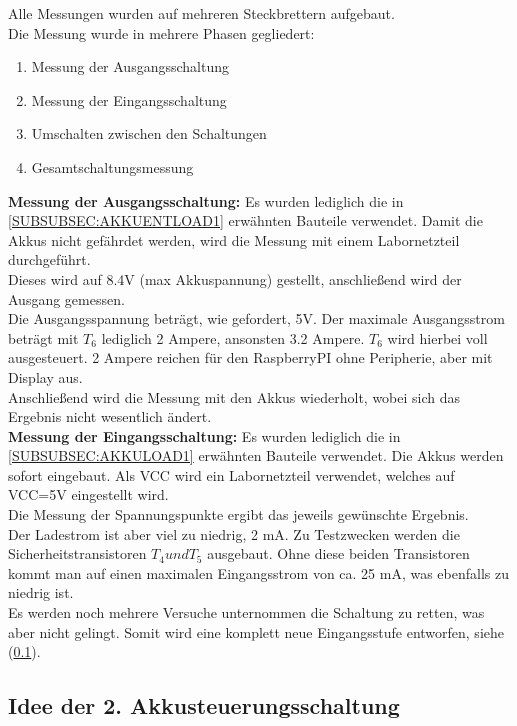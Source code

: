 \documentclass[12pt,a4paper]{article}
\begin{document}
{Alle Messungen wurden auf mehreren Steckbrettern aufgebaut. \\
Die Messung wurde in mehrere Phasen gegliedert:
\begin{enumerate}
	\item{Messung der Ausgangsschaltung}
	\item{Messung der Eingangsschaltung}
	\item{Umschalten zwischen den Schaltungen}
	\item{Gesamtschaltungsmessung}
\end{enumerate}
\textbf{Messung der Ausgangsschaltung:}  Es wurden lediglich die in \ref{SUBSUBSEC:AKKUENTLOAD1} erwähnten Bauteile verwendet. Damit die Akkus nicht gefährdet werden, wird die Messung mit einem Labornetzteil durchgeführt. \\
Dieses wird auf 8.4V (max Akkuspannung) gestellt, anschließend wird der Ausgang gemessen. \\
Die Ausgangsspannung beträgt, wie gefordert, 5V.
Der maximale Ausgangsstrom beträgt mit $T_6$ lediglich 2 Ampere, ansonsten 3.2 Ampere. $T_6$ wird hierbei voll ausgesteuert. 2 Ampere reichen für den RaspberryPI ohne Peripherie, aber mit Display aus. \\
Anschließend wird die Messung mit den Akkus wiederholt, wobei sich das Ergebnis nicht wesentlich ändert.\\[2ex]
\textbf{Messung der Eingangsschaltung:} Es wurden lediglich die in \ref{SUBSUBSEC:AKKULOAD1} erwähnten Bauteile verwendet. Die Akkus werden sofort eingebaut. Als VCC wird ein Labornetzteil verwendet, welches auf VCC=5V eingestellt wird. \\
Die Messung der Spannungspunkte ergibt das jeweils gewünschte Ergebnis. \\
Der Ladestrom ist aber viel zu niedrig, 2 mA. Zu Testzwecken werden die Sicherheitstransistoren $T_4 und T_5$ ausgebaut. Ohne diese beiden Transistoren kommt man auf einen maximalen Eingangsstrom von ca. 25 mA, was ebenfalls zu niedrig ist. \\
Es werden noch mehrere Versuche unternommen die Schaltung zu retten, was aber nicht gelingt. Somit wird eine komplett neue Eingangsstufe entworfen, siehe (\ref{SUBSEC:AKKUSTEUR2}).

\newpage
\subsection{Idee der 2. Akkusteuerungsschaltung}
\label{SUBSEC:AKKUSTEUR2}

}
\end{document}
